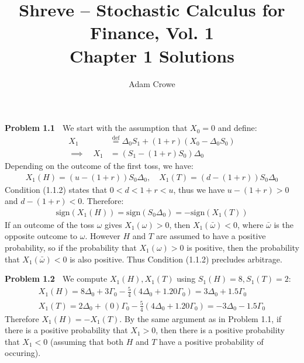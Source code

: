 \documentclass[12pt, letterpaper]{article}
\author{Adam Crowe}
\title{Shreve -- Stochastic Calculus for Finance, Vol. 1 \\ Chapter 1 Solutions}
\begin{document}
\maketitle

\vspace{5mm}
\noindent
\textbf{Problem 1.1} $\;$ We start with the assumption that $X_0 = 0$ and define:
\begin{align*}
    X_1 &\overset{\text{def}}= \Delta_0 S_1 + (1+r)(X_0 - \Delta_0 S_0) \\
    \implies \quad X_1 &= \left( S_1 - (1+r)S_0 \right) \Delta_0
\end{align*}
Depending on the outcome of the first toss, we have:
\begin{align*}
    X_1(H) = \left( u - (1+r) \right) S_0 \Delta_0, \quad
    X_1(T) = \left( d - (1+r) \right) S_0 \Delta_0
\end{align*}
Condition (1.1.2) states that $0 < d < 1 + r < u$, thus we have $u - (1+r) > 0$ and $d-(1+r) < 0$.
Therefore:
\begin{gather*}
    \text{sign}\left( X_1(H) \right) = \text{sign}\left( S_0 \Delta_0 \right) = - \text{sign}\left( X_1(T) \right)
\end{gather*}
If an outcome of the toss $\omega$ gives $X_1(\omega) > 0$, then $X_1(\bar \omega) < 0$, where $\bar \omega$ is the opposite outcome to $\omega$.
However $H$ and $T$ are assumed to have a positive probability, so if the probability that $X_1(\omega) > 0$ is positive, then the probability that $X_1(\bar \omega) < 0$ is also positive.
Thus Condition (1.1.2) precludes arbitrage.

\rightline{$\square$}

\vspace{5mm}
\noindent
\textbf{Problem 1.2} $\;$ We compute $X_1(H), X_1(T)$ using $S_1(H)=8, S_1(T)=2$:
\begin{gather*}
    X_1(H) = 8\Delta_0 + 3\Gamma_0 - \tfrac{5}{4}(4 \Delta_0 + 1.20 \Gamma_0) = 3 \Delta_0 + 1.5 \Gamma_0 \\
    X_1(T) = 2\Delta_0 + (0)\Gamma_0 - \tfrac{5}{4}(4 \Delta_0 + 1.20 \Gamma_0) = - 3 \Delta_0 - 1.5 \Gamma_0
\end{gather*}
Therefore $X_1(H) = - X_1(T)$.
By the same argument as in Problem 1.1, if there is a positive probability that $X_1 > 0$, then there is a positive probability that $X_1 < 0$ (assuming that both $H$ and $T$ have a positive probability of occuring).

\rightline{$\square$}
\end{document}
